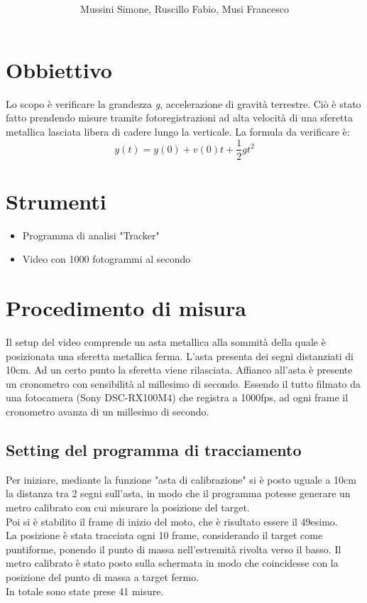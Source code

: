 \documentclass[12pt, a4paper]{article}
\title{\textbf{\scalebox{1.3}{\text{Moto di un grave lungo la verticale}}}}
\date{}
\author{\begin{small}Mussini Simone, Ruscillo Fabio, Musi Francesco\end{small}}
\begin{document}
\maketitle
\section{Obbiettivo}
Lo scopo è verificare la grandezza \textit{g}, accelerazione di gravità terrestre. 
Ciò è stato fatto prendendo misure tramite fotoregistrazioni ad alta velocità di una sferetta metallica lasciata libera di cadere lungo la verticale. 
La formula da verificare è:
\begin{equation*}
    y(t) = y(0) + v(0)t + \frac{1}{2}gt^2
\end{equation*}


\section{Strumenti}
\begin{itemize}
\setlength\itemsep{0mm}
    \item Programma di analisi "Tracker"
    \item Video con 1000 fotogrammi al secondo
\end{itemize}

\section{Procedimento di misura}
Il setup del video comprende un asta metallica alla sommità della quale è posizionata una sferetta metallica ferma. L'asta presenta dei segni distanziati di 10cm. 
Ad un certo punto la sferetta viene rilasciata. Affianco all'asta è presente un cronometro con sensibilità al millesimo di secondo. 
Essendo il tutto filmato da una fotocamera (Sony DSC-RX100M4) che registra a 1000fps, ad ogni frame il cronometro avanza di un millesimo di secondo.

  
\subsection{Setting del programma di tracciamento}
Per iniziare, mediante la funzione "asta di calibrazione" si è posto uguale a 10cm la distanza tra 2 segni sull'asta, in modo che il programma potesse generare un metro calibrato con cui misurare la posizione del target. \\
Poi si è stabilito il frame di inizio del moto, che è risultato essere il 49esimo.  \\
La posizione è stata tracciata ogni 10 frame, considerando il target come puntiforme, ponendo il punto di massa nell'estremità rivolta verso il basso. Il metro calibrato è stato posto sulla schermata in modo che coincidesse con la posizione del punto di massa a target fermo.\\
In totale sono state prese 41 misure. 
\end{document}
